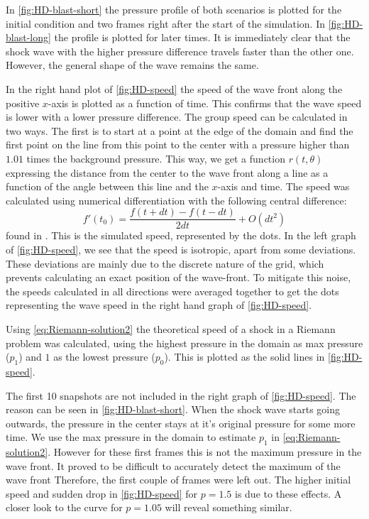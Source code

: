 In \cref{fig:HD-blast-short} the pressure profile of both scenarios is plotted for the initial condition and two frames right after the start of the simulation.
In \cref{fig:HD-blast-long} the profile is plotted for later times.
It is immediately clear that the shock wave with the higher pressure difference travels faster than the other one. However, the general shape of the wave remains the same.


In the right hand plot of \cref{fig:HD-speed} the speed of the wave front along the positive $x$-axis is plotted as a function of time. This confirms that the wave speed is lower with a lower pressure difference.
The group speed can be calculated in two ways. 
The first is to start at a point at the edge of the domain and find the first point on the line from this point to the center with a pressure higher than $1.01$ times the background pressure.
This way, we get a function $r(t,\theta)$ expressing the distance from the center to the wave front along a line as a function of the angle between this line and the $x$-axis and time.
The speed was calculated using numerical differentiation with the following central difference:
\begin{equation*}
	f'(t_0) = \frac{f(t+dt)-f(t-dt)}{2dt} + O(dt^2)
\end{equation*}
found in \cite{numerieke-wiskunde}. 
This is the simulated speed, represented by the dots.
In the left graph of \cref{fig:HD-speed}, we see that the speed is isotropic, apart from some deviations.
These deviations are mainly due to the discrete nature of the grid, which prevents calculating an exact position of the wave-front.
To mitigate this noise, the speeds calculated in all directions were averaged together to get the dots representing the wave speed in the right hand graph of \cref{fig:HD-speed}.

Using \cref{eq:Riemann-solution2} the theoretical speed of a shock in a Riemann problem was calculated, using the highest pressure in the domain as max pressure ($p_1$) and $1$ as the lowest pressure ($p_0$). This is plotted as the solid lines in \cref{fig:HD-speed}.

The first 10 snapshots are not included in the right graph of \cref{fig:HD-speed}. 
The reason can be seen in \cref{fig:HD-blast-short}. 
When the shock wave starts going outwards, the pressure in the center stays at it's original pressure for some more time.
We use the max pressure in the domain to estimate $p_1$ in \cref{eq:Riemann-solution2}. However for these first frames this is not the maximum pressure in the wave front.
It proved to be difficult to accurately detect the maximum of the wave front Therefore, the first couple of frames were left out.
The higher initial speed and sudden drop in \cref{fig:HD-speed} for $p=1.5$ is due to these effects. A closer look to the curve for $p=1.05$ will reveal something similar.

